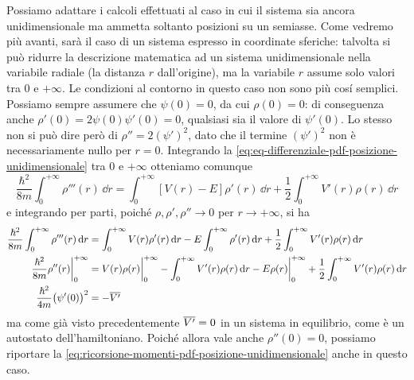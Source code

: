Possiamo adattare i calcoli effettuati al caso in cui il sistema sia ancora unidimensionale ma ammetta soltanto posizioni su un semiasse.
Come vedremo più avanti, sarà il caso di un sistema espresso in coordinate sferiche: talvolta si può ridurre la descrizione matematica ad un sistema unidimensionale nella variabile radiale (la distanza $r$ dall'origine), ma la variabile $r$ assume solo valori tra $0$ e $+\infty$.
Le condizioni al contorno in questo caso non sono più cos\'i semplici.
Possiamo sempre assumere che $\psi(0)=0$, da cui $\rho(0)=0$: di conseguenza anche $\rho'(0)=2\psi(0)\psi'(0)=0$, qualsiasi sia il valore di $\psi'(0)$.
Lo stesso non si può dire però di $\rho''=2(\psi')^2$, dato che il termine $(\psi')^2$ non è necessariamente nullo per $r=0$.
Integrando la \eqref{eq:eq-differenziale-pdf-posizione-unidimensionale} tra $0$ e $+\infty$ otteniamo comunque
\begin{equation}
	\frac{\hbar^2}{8m}\int_0^{+\infty}\rho'''(r)\,\dd r=\int_0^{+\infty}[V(r)-E]\rho'(r)\,\dd r+\frac12\int_0^{+\infty}V'(r)\rho(r)\,\dd r
\end{equation}
e integrando per parti, poich\'e $\rho,\rho',\rho''\to 0$ per $r\to+\infty$, si ha
\begin{equation}
	\begin{aligned}
		\frac{\hbar^2}{8m}\int_0^{+\infty}\rho'''(r)\,\textup{d} r&=\int_0^{+\infty}V(r)\rho'(r)\,\textup{d} r-E\int_0^{+\infty}\rho'(r)\,\textup{d} r+\frac12\int_0^{+\infty}V'(r)\rho(r)\,\textup{d} r\\
		\frac{\hbar^2}{8m}\rho''(r)\bigg|_0^{+\infty}&=V(r)\rho(r)\bigg|_0^{+\infty}-\int_0^{+\infty}V'(r)\rho(r)\,\textup{d} r-E\rho(r)\bigg|_0^{+\infty}+\frac12\int_0^{+\infty}V'(r)\rho(r)\,\textup{d} r\\
		\frac{\hbar^2}{4m}\big(\psi'(0)\big)^2&=-\overline{V'}
	\end{aligned}
\end{equation}
ma come già visto precedentemente $\overline{V'}=0$ in un sistema in equilibrio, come è un autostato dell'hamiltoniano.
Poich\'e allora vale anche $\rho''(0)=0$, possiamo riportare la \eqref{eq:ricorsione-momenti-pdf-posizione-unidimensionale} anche in questo caso.

